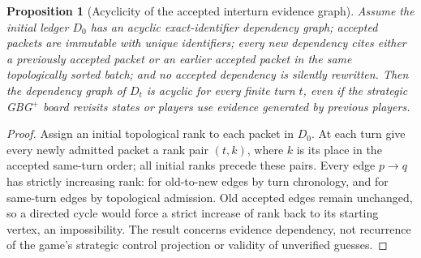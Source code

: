 \documentclass[11pt,letterpaper]{article}
\newtheorem{proposition}[theorem]{Proposition}
\begin{document}
\begin{proposition}[Acyclicity of the accepted interturn evidence graph]\label{prop:interturn}
Assume the initial ledger $D_0$ has an acyclic exact-identifier dependency graph; accepted packets are immutable with unique identifiers; every new dependency cites either a previously accepted packet or an earlier accepted packet in the same topologically sorted batch; and no accepted dependency is silently rewritten. Then the dependency graph of $D_t$ is acyclic for every finite turn $t$, even if the strategic GBG$^+$ board revisits states or players use evidence generated by previous players.
\end{proposition}
\begin{proof}
Assign an initial topological rank to each packet in $D_0$. At each turn give every newly admitted packet a rank pair $(t,k)$, where $k$ is its place in the accepted same-turn order; all initial ranks precede these pairs. Every edge $p\to q$ has strictly increasing rank: for old-to-new edges by turn chronology, and for same-turn edges by topological admission. Old accepted edges remain unchanged, so a directed cycle would force a strict increase of rank back to its starting vertex, an impossibility. The result concerns evidence dependency, not recurrence of the game's strategic control projection or validity of unverified guesses.
\end{proof}
\end{document}
